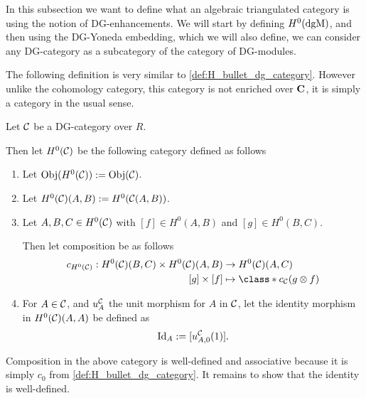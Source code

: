 In this subsection we want to define what an algebraic triangulated category is using the notion of DG-enhancements. We will start by defining \( H^0(\operatorname{dgM}) \), and then using the DG-Yoneda embedding, which we will also define, we can consider any DG-category as a subcategory of the category of DG-modules.

The following definition is very similar to \autoref{def:H_bullet_dg_category}. However unlike the cohomology category, this category is not enriched over \( \operatorname{\mathbf{C}} \), it is simply a category in the usual sense.

\begin{definition}
    \label{def:0_th_cohomology_of_dg_cat}
    Let \( {\mathcal{C}} \) be a DG-category over \( R \).

    Then let \( H^0({\mathcal{C}}) \) be the following category defined as follows
    \begin{enumerate}
        \item {
            Let \( \operatorname{Obj}(H^0({\mathcal{C}})) := \operatorname{Obj}({\mathcal{C}}) \).
        }
        \item {
            Let \( H^0({\mathcal{C}})(A, B) := H^0({\mathcal{C}}(A, B)) \).
        }
        \item {
            Let \( A, B, C \in H^0({\mathcal{C}}) \) with \( [f] \in H^0(A, B) \) and \( [g] \in H^0(B, C) \).

            Then let composition be as follows
            \begin{align*}
                c_{H^0(\Cc)}: H^0(\Cc)(B, C) \times H^0(\Cc)(A, B) &\to H^0(\Cc)(A, C) \\
                [g] \times [f] &\mapsto \class*{ c_{\Cc}(g \otimes f) }
            \end{align*}
        }
        \item {
            For \( A \in {\mathcal{C}} \), and \( u_A^{{\mathcal{C}}} \) the unit morphism for \( A \) in \( {\mathcal{C}} \), let the identity morphism in \( H^0({\mathcal{C}})(A, A) \) be defined as
            \[
                \operatorname{Id}_A := [u_{A, 0}^{{\mathcal{C}}} (1)].
            \]
        }
    \end{enumerate}
\end{definition}

Composition in the above category is well-defined and associative because it is simply \( c_0 \) from \autoref{def:H_bullet_dg_category}. It remains to show that the identity is well-defined.

